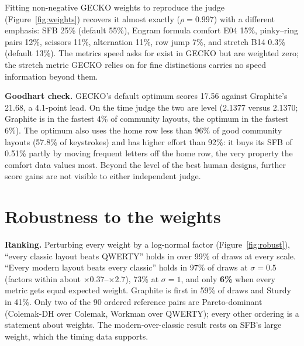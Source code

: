 \documentclass{gecko-paper}
\begin{document}
\begin{paperbody}

Fitting non-negative GECKO weights to reproduce the judge (Figure~\ref{fig:weights}) recovers it almost exactly ($\rho=0.997$) with a different emphasis: SFB 25\% (default 55\%), Engram formula comfort E04 15\%, pinky–ring pairs 12\%, scissors 11\%, alternation 11\%, row jump 7\%, and stretch B14 0.3\% (default 13\%). The metrics speed asks for exist in GECKO but are weighted zero; the stretch metric GECKO relies on for fine distinctions carries no speed information beyond them.

\textbf{Goodhart check.} GECKO's default optimum scores 17.56 against Graphite's 21.68, a 4.1-point lead. On the time judge the two are level (2.1377 versus 2.1370; Graphite is in the fastest 4\% of community layouts, the optimum in the fastest 6\%). The optimum also uses the home row less than 96\% of good community layouts (57.8\% of keystrokes) and has higher effort than 92\%: it buys its SFB of 0.51\% partly by moving frequent letters off the home row, the very property the comfort data values most. Beyond the level of the best human designs, further score gains are not visible to either independent judge.

\section{Robustness to the weights}

\textbf{Ranking.} Perturbing every weight by a log-normal factor (Figure~\ref{fig:robust}), “every classic layout beats QWERTY” holds in over 99\% of draws at every scale. “Every modern layout beats every classic” holds in 97\% of draws at $\sigma=0.5$ (factors within about $\times0.37$–$\times2.7$), 73\% at $\sigma=1$, and only \textbf{6\%} when every metric gets equal expected weight. Graphite is first in 59\% of draws and Sturdy in 41\%. Only two of the 90 ordered reference pairs are Pareto-dominant (Colemak-DH over Colemak, Workman over QWERTY); every other ordering is a statement about weights. The modern-over-classic result rests on SFB's large weight, which the timing data supports.


\end{paperbody}
\end{document}
